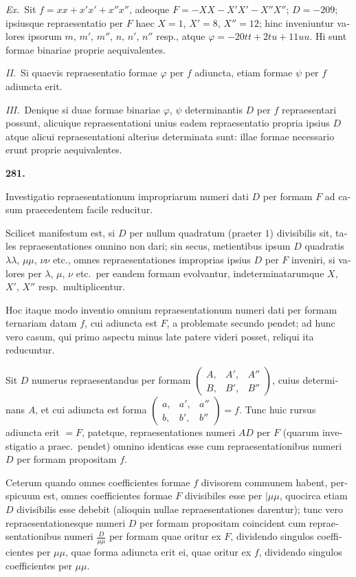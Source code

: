 \documentclass[12pt,a4paper]{article}
\theoremstyle{plain}
\theoremstyle{definition}
\theoremstyle{remark}
\begin{document}
\begin{otherlanguage}{latin}
\textit{Ex.}\ Sit $f = xx + x'x' + x''x''$, adeoque $F = -XX - X'X' - X''X''$; $D = -209$; ipsiusque repraesentatio per $F$ haec $X = 1$, $X' = 8$, $X'' = 12$; hinc inveniuntur valores ipsorum $m$, $m'$, $m''$, $n$, $n'$, $n''$ resp., atque $\varphi = -20tt + 2tu + 11uu$. Hi sunt formae binariae proprie aequivalentes.

\textit{II.}\ Si quaevis repraesentatio formae $\varphi$ per $f$ adiuncta, etiam formae $\psi$ per $f$ adiuncta erit.

\textit{III.}\ Denique si duae formae binariae $\varphi$, $\psi$ determinantis $D$ per $f$ repraesentari possunt, alicuique repraesentationi unius eadem repraesentatio propria ipsius $D$ atque alicui repraesentationi alterius determinata sunt: illae formae necessario erunt proprie aequivalentes.

\bigskip

\textbf{281.}

Investigatio repraesentationum impropriarum numeri dati $D$ per formam $F$ ad casum praecedentem facile reducitur.

Scilicet manifestum est, si $D$ per nullum quadratum (praeter $1$) divisibilis sit, tales repraesentationes omnino non dari; sin secus, metientibus ipsum $D$ quadratis $\lambda\lambda$, $\mu\mu$, $\nu\nu$ etc., omnes repraesentationes improprias ipsius $D$ per $F$ inveniri, si valores per $\lambda$, $\mu$, $\nu$ etc.\ per eandem formam evolvantur, indeterminatarumque $X$, $X'$, $X''$ resp.\ multiplicentur.

Hoc itaque modo inventio omnium repraesentationum numeri dati per formam ternariam datam $f$, cui adiuncta est $F$, a problemate secundo pendet; ad hunc vero casum, qui primo aspectu minus late patere videri posset, reliqui ita reducuntur.

Sit $D$ numerus repraesentandus per formam $\begin{pmatrix} A, & A', & A'' \\ B, & B', & B'' \end{pmatrix}$, cuius determinans $A$, et cui adiuncta est forma $\begin{pmatrix} a, & a', & a'' \\ b, & b', & b'' \end{pmatrix} = f$. Tunc huic rursus adiuncta erit $= F$, patetque, repraesentationes numeri $AD$ per $F$ (quarum investigatio a praec.\ pendet) omnino identicas esse cum repraesentationibus numeri $D$ per formam propositam $f$.

Ceterum quando omnes coefficientes formae $f$ divisorem communem habent, perspicuum est, omnes coefficientes formae $F$ divisibiles esse per $|\mu\mu$, quocirca etiam $D$ divisibilis esse debebit (alioquin nullae repraesentationes darentur); tunc vero repraesentationesque numeri $D$ per formam propositam coincident cum repraesentationibus numeri $\frac{D}{\mu\mu}$ per formam quae oritur ex $F$, dividendo singulos coefficientes per $\mu\mu$, quae forma adiuncta erit ei, quae oritur ex $f$, dividendo singulos coefficientes per $\mu\mu$.


\end{otherlanguage}
\end{document}
